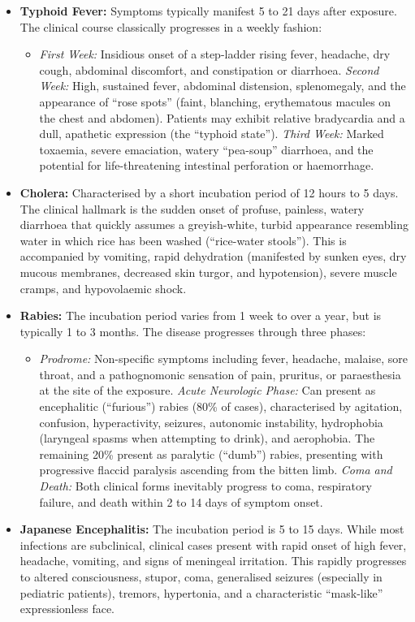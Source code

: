 \begin{itemize}
    \item \textbf{Typhoid Fever:} Symptoms typically manifest 5 to 21 days after exposure. The clinical course classically progresses in a weekly fashion:
    \begin{itemize}
        \item \textit{First Week:} Insidious onset of a step-ladder rising fever, headache, dry cough, abdominal discomfort, and constipation or diarrhoea.
        \textit{Second Week:} High, sustained fever, abdominal distension, splenomegaly, and the appearance of ``rose spots'' (faint, blanching, erythematous macules on the chest and abdomen). Patients may exhibit relative bradycardia and a dull, apathetic expression (the ``typhoid state'').
        \textit{Third Week:} Marked toxaemia, severe emaciation, watery ``pea-soup'' diarrhoea, and the potential for life-threatening intestinal perforation or haemorrhage.
    \end{itemize}
    \item \textbf{Cholera:} Characterised by a short incubation period of 12 hours to 5 days. The clinical hallmark is the sudden onset of profuse, painless, watery diarrhoea that quickly assumes a greyish-white, turbid appearance resembling water in which rice has been washed (``rice-water stools''). This is accompanied by vomiting, rapid dehydration (manifested by sunken eyes, dry mucous membranes, decreased skin turgor, and hypotension), severe muscle cramps, and hypovolaemic shock.
    \item \textbf{Rabies:} The incubation period varies from 1 week to over a year, but is typically 1 to 3 months. The disease progresses through three phases:
    \begin{itemize}
        \item \textit{Prodrome:} Non-specific symptoms including fever, headache, malaise, sore throat, and a pathognomonic sensation of pain, pruritus, or paraesthesia at the site of the exposure.
        \textit{Acute Neurologic Phase:} Can present as encephalitic (``furious'') rabies (80\% of cases), characterised by agitation, confusion, hyperactivity, seizures, autonomic instability, hydrophobia (laryngeal spasms when attempting to drink), and aerophobia. The remaining 20\% present as paralytic (``dumb'') rabies, presenting with progressive flaccid paralysis ascending from the bitten limb.
        \textit{Coma and Death:} Both clinical forms inevitably progress to coma, respiratory failure, and death within 2 to 14 days of symptom onset.
    \end{itemize}
    \item \textbf{Japanese Encephalitis:} The incubation period is 5 to 15 days. While most infections are subclinical, clinical cases present with rapid onset of high fever, headache, vomiting, and signs of meningeal irritation. This rapidly progresses to altered consciousness, stupor, coma, generalised seizures (especially in pediatric patients), tremors, hypertonia, and a characteristic ``mask-like'' expressionless face.
\end{itemize}


